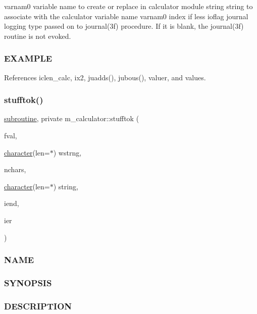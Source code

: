 varnam0 variable name to create or replace in calculator module string string to associate with the calculator variable name varnam0 index if less ioflag journal logging type passed on to journal(3f) procedure. If it is blank, the journal(3f) routine is not evoked. \subsubsection*{E\+X\+A\+M\+P\+LE}

References iclen\+\_\+calc, ix2, juadds(), jubous(), valuer, and values.

\mbox{\label{namespacem__calculator_ae4cc2211f8bd276d5765e4ebc9d6e354}} 
\subsubsection{\texorpdfstring{stufftok()}{stufftok()}}
{\footnotesize\ttfamily \hyperlink{M__stopwatch_83_8txt_acfbcff50169d691ff02d4a123ed70482}{subroutine}, private m\+\_\+calculator\+::stufftok (\begin{DoxyParamCaption}\item[{}]{fval,  }\item[{\hyperlink{option__stopwatch_83_8txt_abd4b21fbbd175834027b5224bfe97e66}{character}(len=$\ast$)}]{wstrng,  }\item[{}]{nchars,  }\item[{\hyperlink{option__stopwatch_83_8txt_abd4b21fbbd175834027b5224bfe97e66}{character}(len=$\ast$)}]{string,  }\item[{}]{iend,  }\item[{}]{ier }\end{DoxyParamCaption})\hspace{0.3cm}{\ttfamily [private]}}



\subsubsection*{N\+A\+ME}

\subsubsection*{S\+Y\+N\+O\+P\+S\+IS}

\subsubsection*{D\+E\+S\+C\+R\+I\+P\+T\+I\+ON}

